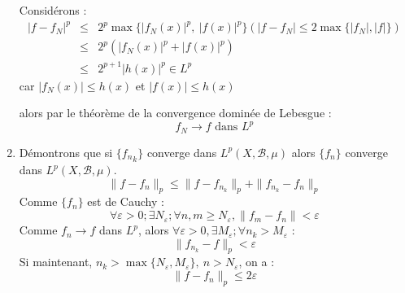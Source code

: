 \begin{dem}
\begin{enumerate}
\bigskip
Considérons :
\begin{eqnarray*}
	|f-f_N|^p&\leq& 2^p \max \{|f_N(x)|^p,\ |f(x)|^p\} (|f-f_N|\leq 2\max\{|f_N|,|f|\})\\
			       &\leq& 2^p (|f_N(x)|^p + |f(x)|^p)\\
				&\leq& 2^{p+1} |h(x)|^p\in L^p
\end{eqnarray*}
car $|f_N(x)|\leq h(x)$ et $|f(x)|\leq h(x)$

alors par le théorème de la convergence dominée de Lebesgue :
\[f_N\to f \text{ dans } L^p\]

\bigskip
\item Démontrons que si $\{{f_n}_k\}$ converge dans $L^p(X,\mathcal{B},\mu)$ alors $\{f_n\}$ converge dans $L^p(X,\mathcal{B},\mu)$.
\[\|f-f_n\|_p\leq \|f-f_{n_k}\|_p + \|f_{n_k}-f_n\|_p\]
Comme $\{f_n\}$ est de Cauchy :
\[\forall \varepsilon>0; \exists N_{\varepsilon}; \forall n,m \geq N_{\varepsilon}, \|f_m-f_n\|<\varepsilon\]
Comme $f_n\to f$ dans $L^p$, alors $\forall \varepsilon>0, \exists M_{\varepsilon}; \forall n_k>M_{\varepsilon}$ :
\[\|f_{n_k}-f\|_p<\varepsilon\]
Si maintenant, $n_k>\max\{N_{\varepsilon}, M_{\varepsilon}\},\ n>N_{\varepsilon}$, on a :
\[\|f-f_n\|_p \leq 2\varepsilon\]
\end{enumerate}
\end{dem}






